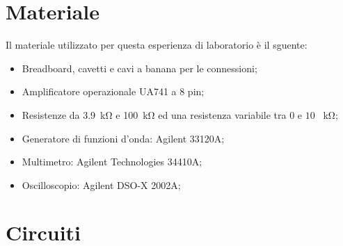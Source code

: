 \section*{Materiale}

Il materiale utilizzato per questa esperienza di laboratorio è il sguente:

\begin{itemize} \itemsep2pt \parskip0pt 
    \item{Breadboard, cavetti e cavi a banana per le connessioni;}
    \item{Amplificatore operazionale UA741 a 8 pin;}
    \item{Resistenze da \SI{3.9}{\kilo\ohm} e \SI{100}{\kilo\ohm} ed una resistenza variabile tra $0$ e $10$ \SI{}{\kilo\ohm};}
    \item{Generatore di funzioni d'onda: Agilent 33120A;}
    \item{Multimetro: Agilent Technologies 34410A;}
    \item{Oscilloscopio: Agilent DSO-X 2002A;}
\end{itemize}

\section*{Circuiti}

